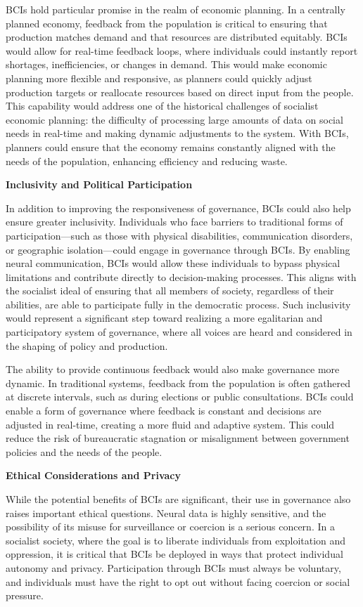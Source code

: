 \begin{refsection}
BCIs hold particular promise in the realm of economic planning. In a centrally planned economy, feedback from the population is critical to ensuring that production matches demand and that resources are distributed equitably. BCIs would allow for real-time feedback loops, where individuals could instantly report shortages, inefficiencies, or changes in demand. This would make economic planning more flexible and responsive, as planners could quickly adjust production targets or reallocate resources based on direct input from the people. This capability would address one of the historical challenges of socialist economic planning: the difficulty of processing large amounts of data on social needs in real-time and making dynamic adjustments to the system. With BCIs, planners could ensure that the economy remains constantly aligned with the needs of the population, enhancing efficiency and reducing waste.

\textbf{Inclusivity and Political Participation}

In addition to improving the responsiveness of governance, BCIs could also help ensure greater inclusivity. Individuals who face barriers to traditional forms of participation—such as those with physical disabilities, communication disorders, or geographic isolation—could engage in governance through BCIs. By enabling neural communication, BCIs would allow these individuals to bypass physical limitations and contribute directly to decision-making processes. This aligns with the socialist ideal of ensuring that all members of society, regardless of their abilities, are able to participate fully in the democratic process. Such inclusivity would represent a significant step toward realizing a more egalitarian and participatory system of governance, where all voices are heard and considered in the shaping of policy and production.

The ability to provide continuous feedback would also make governance more dynamic. In traditional systems, feedback from the population is often gathered at discrete intervals, such as during elections or public consultations. BCIs could enable a form of governance where feedback is constant and decisions are adjusted in real-time, creating a more fluid and adaptive system. This could reduce the risk of bureaucratic stagnation or misalignment between government policies and the needs of the people.

\textbf{Ethical Considerations and Privacy}

While the potential benefits of BCIs are significant, their use in governance also raises important ethical questions. Neural data is highly sensitive, and the possibility of its misuse for surveillance or coercion is a serious concern. In a socialist society, where the goal is to liberate individuals from exploitation and oppression, it is critical that BCIs be deployed in ways that protect individual autonomy and privacy. Participation through BCIs must always be voluntary, and individuals must have the right to opt out without facing coercion or social pressure. 


\end{refsection}
